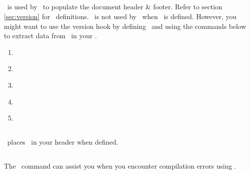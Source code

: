 \documentclass[12pt]{tlc-article}
\begin{document}

\subsection{\tlcVE}
\tlcVE\ is used by \tlcA\ to populate the document header \& footer.  Refer to
section \ref{sec:version} for \tlcVE\ definitions. \tlcVE\ is not
used by \tlcA\ when \tlcHF\ is defined.  However, you might want to use the
version hook by defining \tlcVE\ and using the commands below to extract data
from \tlcVE\ in your \tlcHF.
\begin{enumerate}
  \item \tlcVC\
  \item \tlcDC\
  \item \tlcSC\
  \item \tlcIC\
  \item \tlcPC\
\end{enumerate}


\subsection{\tlcLG}
\tlcA\ places \tlcLG\ in your header when defined.


\subsection{\tlcDebug}
The \tlcDebug\ command can assist you when you encounter compilation errors using
\tlcA.

\tlcVspace
\end{document}
